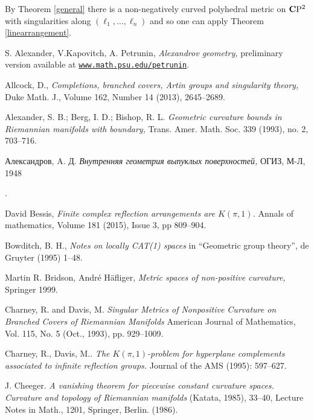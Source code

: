 \documentclass{compositio}
\begin{document}
By Theorem \ref{general} there is a non-negatively curved polyhedral metric on
$\mathbf{C}\mathrm{P}^2$ with singularities along $(\ell_1,\dots,\ell_n)$ and so one can apply Theorem \ref{linearrangement}.
\qeds


\begin{thebibliography}{52}

 S. Alexander, V.Kapovitch, A. Petrunin, 
\textit{Alexandrov geometry,}
preliminary version available at \href{http://www.math.psu.edu/petrunin/}{\tt www.math.psu.edu/petrunin}.

 Allcock, D.,
\textit{Completions, branched covers, Artin groups and singularity theory,}
Duke Math. J., Volume 162, Number 14 (2013), 2645--2689. 

Alexander, S. B.; Berg, I. D.; Bishop, R. L. 
\textit{Geometric curvature bounds in Riemannian manifolds with boundary,} 
Trans. Amer. Math. Soc. 339 (1993), no. 2, 703--716.


\begin{otherlanguage}{russian}
Александров, A. Д.
\textit{Внутренняя геометрия выпуклых поверхностей,} ОГИЗ, М-Л, 1948
    \end{otherlanguage}.

 David Bessis, 
\textit{Finite complex reflection arrangements are $K(\pi,1)$.}
Annals of mathematics,  Volume 181 (2015), Issue 3, pp 809--904.

 Bowditch, B. H.,
\textit{Notes on locally CAT(1) spaces}
in ``Geometric group theory'',  de Gruyter (1995) 1--48.

 Martin R. Bridson, Andr\'e H\"afliger, 
\textit{Metric spaces of non-positive curvature,} Springer 1999.

Charney, R. and  Davis, M.
\textit{Singular Metrics of Nonpositive Curvature on Branched Covers of Riemannian Manifolds}
American Journal of Mathematics, Vol. 115, No. 5 (Oct., 1993), pp. 929--1009.

Charney, R., Davis, M.. 
\textit{The $K(\pi,1)$-problem for hyperplane complements associated to infinite reflection groups.} 
Journal of the AMS (1995): 597--627.

J. Cheeger. 
\textit{A vanishing theorem for piecewise constant curvature spaces. Curvature and topology of Riemannian manifolds}
(Katata, 1985), 33--40, 
Lecture Notes in Math.,
1201, Springer, Berlin. (1986).


\end{thebibliography}
\end{document}
